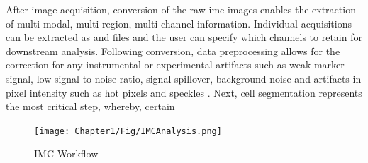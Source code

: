 
\par After image acquisition, conversion of the raw \gls{imc} images enables the extraction of multi-modal, multi-region, multi-channel information. Individual acquisitions can be extracted as  and  files and the user can specify which channels to retain for downstream analysis. Following conversion, data preprocessing allows for the correction for any instrumental or experimental artifacts such as weak marker signal, low signal-to-noise ratio, signal spillover, background noise and artifacts in pixel intensity such as hot pixels and speckles \textbf{\cite{milosevic_different_2023}}. Next, cell segmentation represents the most critical step, whereby, certain 

\begin{figure}[H]
    \centering
    \texttt{[image: Chapter1/Fig/IMCAnalysis.png]}
    \caption{IMC Workflow}
    \label{fig:enter-label}
\end{figure}


